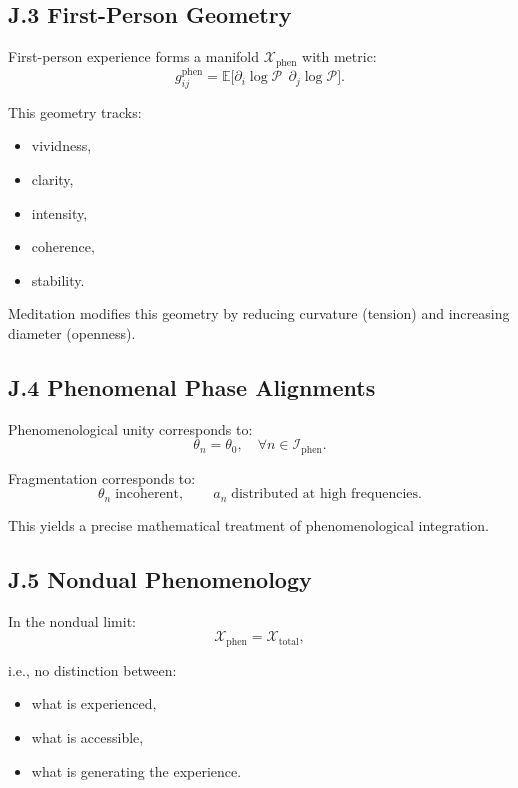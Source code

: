 \documentclass[12pt]{article}
\begin{document}
\subsection*{J.3 First-Person Geometry}

First-person experience forms a manifold $\mathcal{X}_{\text{phen}}$ with metric:
\[
g_{ij}^{\text{phen}}
=
\mathbb{E}\Big[
\partial_i \log \mathcal{P}
\;\,
\partial_j \log \mathcal{P}
\Big].
\]

This geometry tracks:
\begin{itemize}
\item vividness,
\item clarity,
\item intensity,
\item coherence,
\item stability.
\end{itemize}

Meditation modifies this geometry by reducing curvature (tension) and increasing
diameter (openness).

\subsection*{J.4 Phenomenal Phase Alignments}

Phenomenological unity corresponds to:
\[
\theta_n = \theta_0,\quad \forall n \in \mathcal{I}_{\text{phen}}.
\]

Fragmentation corresponds to:
\[
\theta_n \; \text{incoherent},
\qquad
a_n \; \text{distributed at high frequencies}.
\]

This yields a precise mathematical treatment of phenomenological integration.

\subsection*{J.5 Nondual Phenomenology}

In the nondual limit:
\[
\mathcal{X}_{\text{phen}} = \mathcal{X}_{\text{total}},
\]

i.e., no distinction between:
\begin{itemize}
\item what is experienced,
\item what is accessible,
\item what is generating the experience.
\end{itemize}
\end{document}
